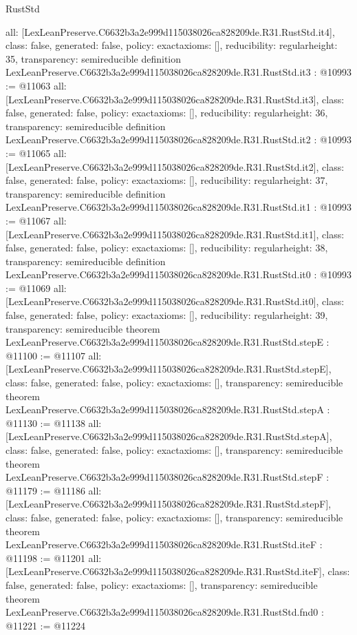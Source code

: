 \begin{lexlean}{RustStd}
\begin{coremodule}
{  all: [LexLeanPreserve.C6632b3a2e999d115038026ca828209de.R31.RustStd.it4],
  class: false,
  generated: false,
  policy: exact{axioms: []},
  reducibility: regular{height: 35},
  transparency: semireducible
}
definition LexLeanPreserve.C6632b3a2e999d115038026ca828209de.R31.RustStd.it3 : @10993 := @11063 {
  all: [LexLeanPreserve.C6632b3a2e999d115038026ca828209de.R31.RustStd.it3],
  class: false,
  generated: false,
  policy: exact{axioms: []},
  reducibility: regular{height: 36},
  transparency: semireducible
}
definition LexLeanPreserve.C6632b3a2e999d115038026ca828209de.R31.RustStd.it2 : @10993 := @11065 {
  all: [LexLeanPreserve.C6632b3a2e999d115038026ca828209de.R31.RustStd.it2],
  class: false,
  generated: false,
  policy: exact{axioms: []},
  reducibility: regular{height: 37},
  transparency: semireducible
}
definition LexLeanPreserve.C6632b3a2e999d115038026ca828209de.R31.RustStd.it1 : @10993 := @11067 {
  all: [LexLeanPreserve.C6632b3a2e999d115038026ca828209de.R31.RustStd.it1],
  class: false,
  generated: false,
  policy: exact{axioms: []},
  reducibility: regular{height: 38},
  transparency: semireducible
}
definition LexLeanPreserve.C6632b3a2e999d115038026ca828209de.R31.RustStd.it0 : @10993 := @11069 {
  all: [LexLeanPreserve.C6632b3a2e999d115038026ca828209de.R31.RustStd.it0],
  class: false,
  generated: false,
  policy: exact{axioms: []},
  reducibility: regular{height: 39},
  transparency: semireducible
}
theorem LexLeanPreserve.C6632b3a2e999d115038026ca828209de.R31.RustStd.stepE : @11100 := @11107 {
  all: [LexLeanPreserve.C6632b3a2e999d115038026ca828209de.R31.RustStd.stepE],
  class: false,
  generated: false,
  policy: exact{axioms: []},
  transparency: semireducible
}
theorem LexLeanPreserve.C6632b3a2e999d115038026ca828209de.R31.RustStd.stepA : @11130 := @11138 {
  all: [LexLeanPreserve.C6632b3a2e999d115038026ca828209de.R31.RustStd.stepA],
  class: false,
  generated: false,
  policy: exact{axioms: []},
  transparency: semireducible
}
theorem LexLeanPreserve.C6632b3a2e999d115038026ca828209de.R31.RustStd.stepF : @11179 := @11186 {
  all: [LexLeanPreserve.C6632b3a2e999d115038026ca828209de.R31.RustStd.stepF],
  class: false,
  generated: false,
  policy: exact{axioms: []},
  transparency: semireducible
}
theorem LexLeanPreserve.C6632b3a2e999d115038026ca828209de.R31.RustStd.iteF : @11198 := @11201 {
  all: [LexLeanPreserve.C6632b3a2e999d115038026ca828209de.R31.RustStd.iteF],
  class: false,
  generated: false,
  policy: exact{axioms: []},
  transparency: semireducible
}
theorem LexLeanPreserve.C6632b3a2e999d115038026ca828209de.R31.RustStd.fnd0 : @11221 := @11224 {
}
\end{coremodule}
\end{lexlean}
